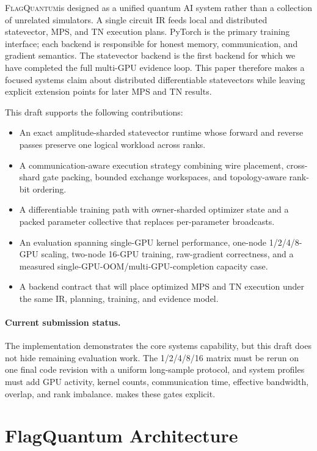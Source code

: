 \documentclass[10pt,twocolumn]{article}
\newcommand{\system}{\textsc{FlagQuantum}}
\begin{document}
\system is designed as a unified quantum AI system rather than a collection of
unrelated simulators.  A single circuit IR feeds local and distributed
statevector, MPS, and TN execution plans.  PyTorch is the primary training
interface; each backend is responsible for honest memory, communication, and
gradient semantics.  The statevector backend is the first backend for which we
have completed the full multi-GPU evidence loop.  This paper therefore makes a
focused systems claim about distributed differentiable statevectors while
leaving explicit extension points for later MPS and TN results.

This draft supports the following contributions:
\begin{itemize}[leftmargin=*,nosep]
  \item An exact amplitude-sharded statevector runtime whose forward and
  reverse passes preserve one logical workload across ranks.
  \item A communication-aware execution strategy combining wire placement,
  cross-shard gate packing, bounded exchange workspaces, and topology-aware
  rank-bit ordering.
  \item A differentiable training path with owner-sharded optimizer state and
  a packed parameter collective that replaces per-parameter broadcasts.
  \item An evaluation spanning single-GPU kernel performance, one-node
  1/2/4/8-GPU scaling, two-node 16-GPU training, raw-gradient correctness,
  and a measured single-GPU-OOM/multi-GPU-completion capacity case.
  \item A backend contract that will place optimized MPS and TN execution
  under the same IR, planning, training, and evidence model.
\end{itemize}

\paragraph{Current submission status.}
The implementation demonstrates the core systems capability, but this draft
does not hide remaining evaluation work.  The 1/2/4/8/16 matrix must be rerun
on one final code revision with a uniform long-sample protocol, and system
profiles must add GPU activity, kernel counts, communication time, effective
bandwidth, overlap, and rank imbalance.   makes these gates
explicit.

\section{FlagQuantum Architecture}
\label{sec:architecture}
\end{document}
